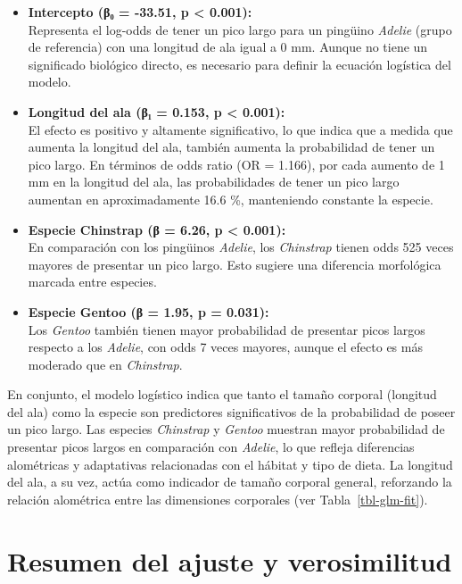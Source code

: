 \documentclass[
  spanish,
  11pt,
  a4paper,
  DIV=11,
  numbers=noendperiod]{scrartcl}
\begin{document}
\begin{longtable}[]
\end{longtable}

\begin{itemize}
\item
  \textbf{Intercepto (β₀ = -33.51, p \textless{} 0.001):}\\
  Representa el log-odds de tener un pico largo para un pingüino
  \emph{Adelie} (grupo de referencia) con una longitud de ala igual a 0
  mm. Aunque no tiene un significado biológico directo, es necesario
  para definir la ecuación logística del modelo.
\item
  \textbf{Longitud del ala (β₁ = 0.153, p \textless{} 0.001):}\\
  El efecto es positivo y altamente significativo, lo que indica que a
  medida que aumenta la longitud del ala, también aumenta la
  probabilidad de tener un pico largo. En términos de odds ratio (OR =
  1.166), por cada aumento de 1 mm en la longitud del ala, las
  probabilidades de tener un pico largo aumentan en aproximadamente 16.6
  \%, manteniendo constante la especie.
\item
  \textbf{Especie Chinstrap (β = 6.26, p \textless{} 0.001):}\\
  En comparación con los pingüinos \emph{Adelie}, los \emph{Chinstrap}
  tienen odds 525 veces mayores de presentar un pico largo. Esto sugiere
  una diferencia morfológica marcada entre especies.
\item
  \textbf{Especie Gentoo (β = 1.95, p = 0.031):}\\
  Los \emph{Gentoo} también tienen mayor probabilidad de presentar picos
  largos respecto a los \emph{Adelie}, con odds 7 veces mayores, aunque
  el efecto es más moderado que en \emph{Chinstrap}.
\end{itemize}

En conjunto, el modelo logístico indica que tanto el tamaño corporal
(longitud del ala) como la especie son predictores significativos de la
probabilidad de poseer un pico largo. Las especies \emph{Chinstrap} y
\emph{Gentoo} muestran mayor probabilidad de presentar picos largos en
comparación con \emph{Adelie}, lo que refleja diferencias alométricas y
adaptativas relacionadas con el hábitat y tipo de dieta. La longitud del
ala, a su vez, actúa como indicador de tamaño corporal general,
reforzando la relación alométrica entre las dimensiones corporales (ver
Tabla~\ref{tbl-glm-fit}).

\section{Resumen del ajuste y
verosimilitud}\label{resumen-del-ajuste-y-verosimilitud}
\end{document}

